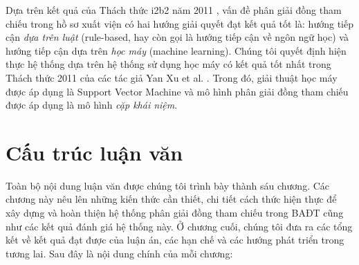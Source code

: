 Dựa trên kết quả của Thách thức i2b2 năm 2011 \cite{OzlemUzuner2012}, vấn đề phân giải đồng tham chiếu trong hồ sơ xuất viện có hai hướng giải quyết đạt kết quả tốt là: hướng tiếp cận \emph{dựa trên luật} (rule-based, hay còn gọi là hướng tiếp cận về ngôn ngữ học) và hướng tiếp cận dựa trên \emph{học máy} (machine learning). Chúng tôi quyết định hiện thực hệ thống dựa trên hệ thống sử dụng học máy có kết quả tốt nhất trong Thách thức 2011 của các tác giả Yan Xu et al. \cite{YanXu2012}. Trong đó, giải thuật học máy được áp dụng là Support Vector Machine và mô hình phân giải đồng tham chiếu được áp dụng là mô hình \emph{cặp khái niệm}.

\section{Cấu trúc luận văn}
Toàn bộ nội dung luận văn được chúng tôi trình bày thành sáu chương. Các chương này nêu lên những kiến thức cần thiết, chi tiết cách thức hiện thực để xây dựng và hoàn thiện hệ thống phân giải đồng tham chiếu trong BAĐT cũng như các kết quả đánh giá hệ thống này. Ở chương cuối, chúng tôi đưa ra các tổng kết về kết quả đạt được của luận án, các hạn chế và các hướng phát triển trong tương lai. Sau đây là nội dung chính của mỗi chương:

